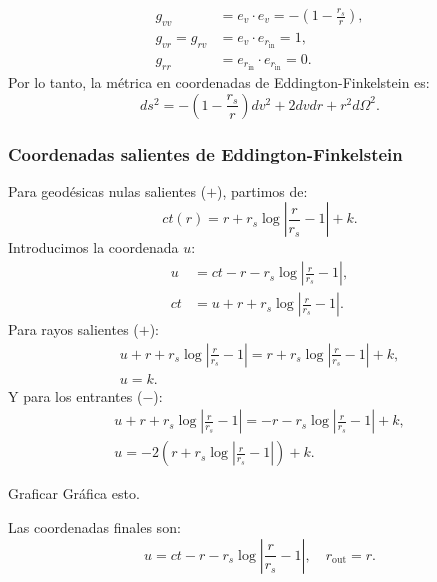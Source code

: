 \begin{equation}
    \begin{aligned}
        g_{vv}          & = e_v \cdot e_v = -\left(1 - \frac{r_s}{r}\right), \\
        g_{vr} = g_{rv} & = e_v \cdot e_{r_{\text{in}}} = 1,                 \\
        g_{rr}          & = e_{r_{\text{in}}} \cdot e_{r_{\text{in}}} = 0.
    \end{aligned}
\end{equation}
Por lo tanto, la métrica en coordenadas de Eddington-Finkelstein es:
\begin{equation}
    ds^2 = -\left(1 - \frac{r_s}{r}\right) dv^2 + 2 dv dr + r^2 d\Omega^2.
\end{equation}
\subsubsection{Coordenadas salientes de Eddington-Finkelstein}
\noindent Para geodésicas nulas salientes (\(+\)), partimos de:
\begin{equation}
    ct(r) = r + r_s \log \left| \frac{r}{r_s} - 1 \right| + k.
\end{equation}
Introducimos la coordenada \( u \):
\begin{equation}
    \begin{aligned}
        u  & = ct - r - r_s \log \left| \frac{r}{r_s} - 1 \right|, \\
        ct & = u + r + r_s \log \left| \frac{r}{r_s} - 1 \right|.
    \end{aligned}
\end{equation}
Para rayos salientes (\(+\)):
\begin{equation}
    \begin{aligned}
        u + r + r_s \log \left| \frac{r}{r_s} - 1 \right| = r + r_s \log \left| \frac{r}{r_s} - 1 \right| + k, \\
        u = k.
    \end{aligned}
\end{equation}
Y para los entrantes (\(-\)):
\begin{equation}
    \begin{aligned}
        u + r + r_s \log \left| \frac{r}{r_s} - 1 \right| = -r - r_s \log \left| \frac{r}{r_s} - 1 \right| + k, \\
        u = -2\left(r + r_s \log \left| \frac{r}{r_s} - 1 \right|  \right) +k.
    \end{aligned}
\end{equation}
\begin{task}{Graficar}{}
    Gráfica esto.
\end{task}
Las coordenadas finales son:
\begin{equation}
    \boxed{u = ct - r - r_s \log \left| \frac{r}{r_s} - 1 \right|, \quad r_{\text{out}} = r}.
\end{equation}

